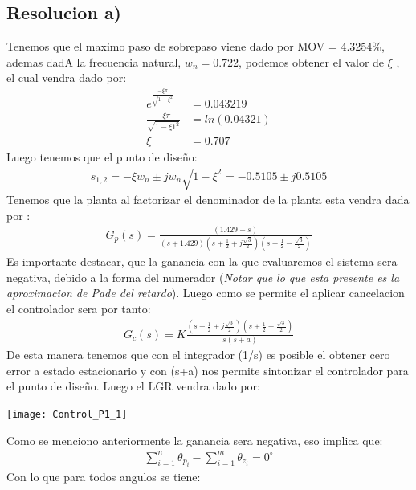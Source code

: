\documentclass[
  11pt,
  letterpaper,
   addpoints,
   answers
  ]{exam}
\begin{document}
\begin{questions}
\begin{solution}
    \subsection*{Resolucion a)}
    Tenemos que el maximo paso de sobrepaso viene dado por MOV = 4.3254\%, ademas dadA la frecuencia natural, $w_n = 0.722$, podemos obtener el valor de $\xi$ , el cual vendra dado por:
    \begin{align}
        e^{\frac{-\xi \pi}{\sqrt{1-\xi^{2}}}} &= 0.043219\\
        \frac{-\xi \pi}{\sqrt{1-\xi1^{2}}} &= ln(0.04321)\\
        \xi &= 0.707
    \end{align}
    Luego tenemos que el punto de diseño:
    \begin{align}
        s_{1,2} = -\xi w_n \pm jw_n\sqrt{1-\xi^{2}} = -0.5105 \pm j0.5105
    \end{align}
    Tenemos que  la planta al factorizar el denominador de la planta esta vendra dada por :
    \begin{align}
        G_{p}(s) = \frac{(1.429 - s)}{(s+1.429)\left(s + \frac{1}{2} + j\frac{\sqrt{3}}{2}\right)\left(s+ \frac{1}{2} - \frac{\sqrt{3}}{2}\right)}
    \end{align}
    Es importante destacar, que la ganancia con la que evaluaremos el sistema sera negativa, debido a la forma del numerador (\textit{Notar que lo que esta presente es la aproximacion de Pade del retardo}). Luego como se permite el aplicar cancelacion el controlador sera por tanto:
    \begin{align}
        G_{c}(s) = K \frac{\left(s + \frac{1}{2} + j\frac{\sqrt{3}}{2}\right)\left(s+ \frac{1}{2} - \frac{\sqrt{3}}{2}\right)}{s(s+a)}
    \end{align}
    De esta manera tenemos que con el integrador (1/s) es posible el obtener cero error a estado estacionario y con (s+a) nos permite sintonizar el controlador para el punto de diseño. Luego el LGR vendra dado por:
    \begin{center}
        \texttt{[image: Control\_P1\_1]}
      \end{center}
    Como se menciono anteriormente la ganancia sera negativa, eso implica que:
    \begin{align}
        \sum_{i=1}^{n} \theta_{p_{i}} - \sum_{i=1}^{m} \theta_{z_{i}} = 0^{\circ} 
    \end{align}
    Con lo que para todos angulos se tiene:
    \begin{align}

\end{align}
\end{solution}
\end{questions}
\end{document}
